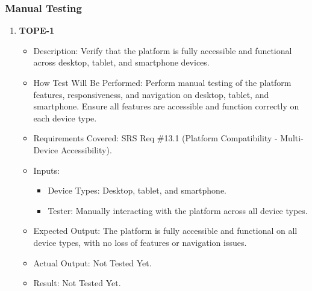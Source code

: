 \documentclass[12pt, titlepage]{article}
\begin{document}
\subsubsection{Manual Testing}
\begin{enumerate}
    \item \textbf{TOPE-1}  
    \begin{itemize}
        \item Description: Verify that the platform is fully accessible and functional across desktop, tablet, and smartphone devices.
        \item How Test Will Be Performed: Perform manual testing of the platform features, responsiveness, and navigation on desktop, tablet, and smartphone. Ensure all features are accessible and function correctly on each device type.
        \item Requirements Covered: SRS Req \#13.1 (Platform Compatibility - Multi-Device Accessibility).
        \item Inputs:  
            \begin{itemize}
                \item Device Types: Desktop, tablet, and smartphone.
                \item Tester: Manually interacting with the platform across all device types.
            \end{itemize}
        \item Expected Output: The platform is fully accessible and functional on all device types, with no loss of features or navigation issues.
        \item Actual Output: Not Tested Yet.
        \item Result: Not Tested Yet.
    \end{itemize}


\end{enumerate}
\end{document}
